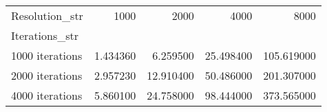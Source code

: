 \begin{tabular}{lrrrr}
\toprule
Resolution_str & 1000 & 2000 & 4000 & 8000 \\
Iterations_str &  &  &  &  \\
\midrule
1000 iterations & 1.434360 & 6.259500 & 25.498400 & 105.619000 \\
2000 iterations & 2.957230 & 12.910400 & 50.486000 & 201.307000 \\
4000 iterations & 5.860100 & 24.758000 & 98.444000 & 373.565000 \\
\bottomrule
\end{tabular}
